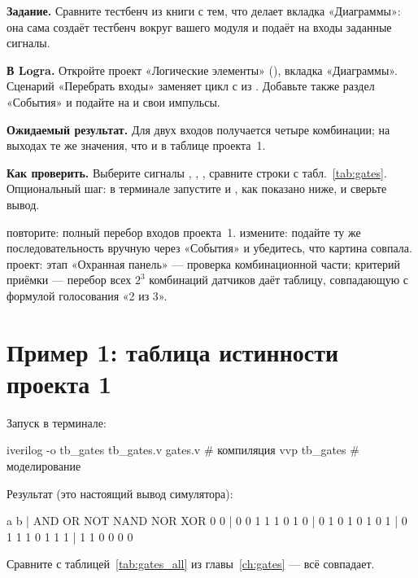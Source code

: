 \begin{diybox}
\textbf{Задание.} Сравните тестбенч из книги с тем, что делает вкладка «Диаграммы»: она сама создаёт тестбенч вокруг вашего модуля и подаёт на входы заданные сигналы.

\textbf{В Logra.} Откройте проект «Логические элементы» (), вкладка «Диаграммы». Сценарий «Перебрать входы» заменяет цикл с  из . Добавьте также раздел «События» и подайте на  и  свои импульсы.

\textbf{Ожидаемый результат.} Для двух входов получается четыре комбинации; на выходах те же значения, что и в таблице проекта~1.

\textbf{Как проверить.} Выберите сигналы , , , сравните строки с табл.~\ref{tab:gates}. Опциональный шаг: в терминале запустите  и , как показано ниже, и сверьте вывод.

 повторите: полный перебор входов проекта~1.  измените: подайте ту же последовательность вручную через «События» и убедитесь, что картина совпала.  проект: этап «Охранная панель» --- проверка комбинационной части; критерий приёмки --- перебор всех $2^3$ комбинаций датчиков даёт таблицу, совпадающую с формулой голосования «2 из 3».
\end{diybox}

\section{Пример 1: таблица истинности проекта 1}


Запуск в терминале:
\begin{vcode}[bash]
iverilog -o tb_gates tb_gates.v gates.v   # компиляция
vvp tb_gates                              # моделирование
\end{vcode}

Результат (это настоящий вывод симулятора):
\begin{vcode}[text]
 a b | AND OR NOT NAND NOR XOR
 0 0 |  0   0   1    1    1   0
 1 0 |  0   1   0    1    0   1
 0 1 |  0   1   1    1    0   1
 1 1 |  1   1   0    0    0   0
\end{vcode}

Сравните с таблицей~\ref{tab:gates_all} из главы~\ref{ch:gates} --- всё совпадает.

